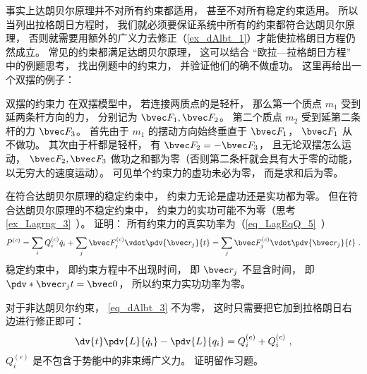 事实上达朗贝尔原理并不对所有约束都适用， 甚至不对所有稳定约束适用。 所以当列出拉格朗日方程时， 我们就必须要保证系统中所有的约束都符合达朗贝尔原理， 否则就需要用额外的广义力去修正（\autoref{ex_dAlbt_1}）才能使拉格朗日方程仍然成立。 常见的约束都满足达朗贝尔原理， 这可以结合 “欧拉—拉格朗日方程” 中的例题思考， 找出例题中的约束力， 并验证他们的确不做虚功。 这里再给出一个双摆的例子：

\begin{example}{双摆的约束力}
在双摆模型中， 若连接两质点的是轻杆， 那么第一个质点 $m_1$ 受到延两条杆方向的力， 分别记为 $\bvec F_1, \bvec F_2$。 第二个质点 $m_2$ 受到延第二条杆的力 $\bvec F_3$。 首先由于 $m_1$ 的摆动方向始终垂直于 $\bvec F_1$， $\bvec F_1$ 从不做功。 其次由于杆都是轻杆， 有 $\bvec F_2 = -\bvec F_3$， 且无论双摆怎么运动， $\bvec F_2, \bvec F_3$ 做功之和都为零（否则第二条杆就会具有大于零的动能， 以无穷大的速度运动）。 可见单个约束力的虚功未必为零， 而是求和后为零。
\end{example}

在符合达朗贝尔原理的稳定约束中， 约束力无论是虚功还是实功都为零。 但在符合达朗贝尔原理的不稳定约束中， 约束力的实功可能不为零（思考\autoref{ex_Lagrng_3}~）。 证明： 所有约束力的真实功率为（\autoref{eq_LagEqQ_5}~）
\begin{equation}
P^{(c)} = \sum_i Q_i^{(c)} \dot q_i + \sum_j \bvec F_j^{(c)} \vdot \pdv{\bvec r_j}{t} = \sum_j \bvec F_j^{(c)} \vdot \pdv{\bvec r_j}{t}~.
\end{equation}
稳定约束中， 即约束方程中不出现时间， 即 $\bvec r_j$ 不显含时间， 即 $\pdv*{\bvec r_j}{t} = \bvec 0$， 所以约束力实功功率为零。

对于非达朗贝尔约束， \autoref{eq_dAlbt_3} 不为零， 这时只需要把它加到拉格朗日右边进行修正即可：
\begin{equation}
\dv{t}\pdv{L}{\dot q_i} - \pdv{L}{q_i} = Q_i^{(e)} + Q_i^{(c)}~,
\end{equation}
$Q_i^{(e)}$ 是不包含于势能中的非束缚广义力。 证明留作习题。

